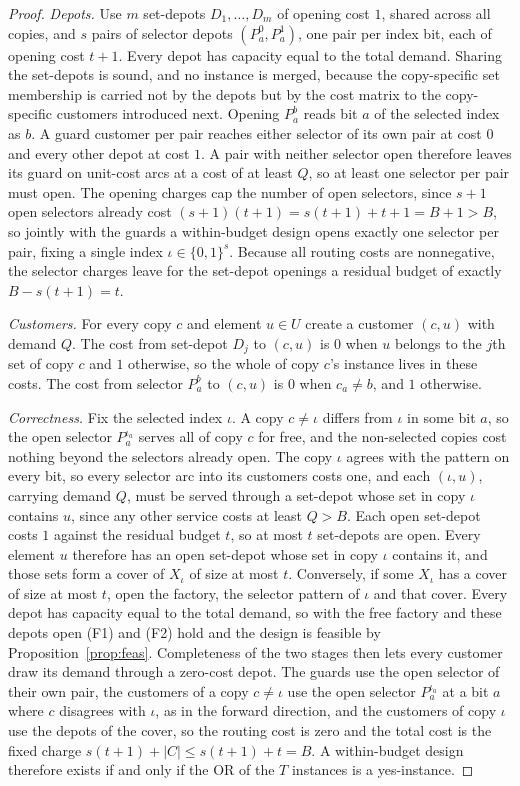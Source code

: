 \begin{proof}
\emph{Depots.} Use $m$ set-depots $D_1,\dots,D_m$ of opening cost $1$,
shared across all copies, and $s$ pairs of selector depots
$(P_a^{0},P_a^{1})$, one pair per index bit, each of opening cost $t+1$.
Every depot has capacity equal to the total demand. Sharing the
set-depots is sound, and no instance is merged, because the
copy-specific set membership is carried not by the depots but by the
cost matrix to the copy-specific customers introduced next. Opening
$P_a^{b}$ reads bit $a$ of the selected index as $b$. A guard customer
per pair reaches either selector of its own pair at cost $0$ and every
other depot at cost $1$. A pair with neither selector open therefore
leaves its guard on unit-cost arcs at a cost of at least $Q$, so at
least one selector per pair must open. The opening charges cap the
number of open selectors, since $s+1$ open selectors already cost
$(s+1)(t+1)=s(t+1)+t+1=B+1>B$, so
jointly with the guards a within-budget design opens exactly one
selector per pair, fixing a single index $\iota\in\{0,1\}^{s}$. Because
all routing costs are nonnegative, the selector charges leave for the
set-depot openings a residual budget of exactly $B-s(t+1)=t$.

\emph{Customers.} For every copy $c$ and element $u\in U$ create a
customer $(c,u)$ with demand $Q$. The cost from set-depot $D_j$ to
$(c,u)$ is $0$ when $u$ belongs to the $j$th set of copy $c$ and $1$
otherwise, so the whole of copy $c$'s instance lives in these costs. The
cost from selector $P_a^{b}$ to $(c,u)$ is $0$ when $c_a\ne b$, and $1$
otherwise.

\emph{Correctness.} Fix the selected index $\iota$. A copy $c\ne\iota$
differs from $\iota$ in some bit $a$, so the open selector
$P_a^{\iota_a}$ serves all of copy $c$ for free, and the non-selected
copies cost nothing beyond the selectors already open. The copy $\iota$
agrees with the pattern on every bit, so every selector arc into its
customers costs one, and each $(\iota,u)$, carrying demand $Q$, must be
served through a set-depot whose set in copy $\iota$ contains $u$, since
any other service costs at least $Q>B$. Each open set-depot costs $1$
against the residual budget $t$, so at most $t$ set-depots are open.
Every element $u$ therefore has an open set-depot whose set in copy
$\iota$ contains it, and those sets form a cover of
$X_\iota$ of size at most $t$. Conversely, if some $X_\iota$ has a cover
of size at most $t$, open the factory, the selector pattern of $\iota$ and
that cover. Every depot has capacity equal to the total demand, so with
the free factory and these depots open (F1) and (F2) hold and the design
is feasible by Proposition~\ref{prop:feas}. Completeness of the two
stages then lets every customer draw its demand through a zero-cost
depot. The guards use the open selector of their own pair, the customers
of a copy $c\ne\iota$ use the open selector $P_a^{\iota_a}$ at a bit $a$
where $c$ disagrees with $\iota$, as in the forward direction, and the
customers of copy $\iota$ use the depots of the cover, so the routing
cost is zero and the total cost is the fixed charge
$s(t+1)+|C|\le s(t+1)+t=B$. A within-budget design therefore exists if and
only if the OR of the $T$ instances is a yes-instance.


\end{proof}
